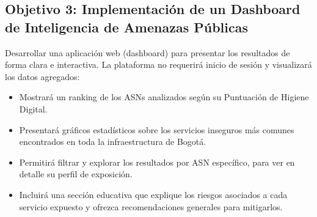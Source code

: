 \subsection{Objetivo 3: Implementación de un Dashboard de Inteligencia de Amenazas Públicas}

Desarrollar una aplicación web (dashboard) para presentar los resultados de forma clara e interactiva. La plataforma no requerirá inicio de sesión y visualizará los datos agregados:

\begin{itemize}
  \item Mostrará un ranking de los ASNs analizados según su Puntuación de Higiene Digital.
  \item Presentará gráficos estadísticos sobre los servicios inseguros más comunes encontrados en toda la infraestructura de Bogotá.
  \item Permitirá filtrar y explorar los resultados por ASN específico, para ver en detalle su perfil de exposición.
  \item Incluirá una sección educativa que explique los riesgos asociados a cada servicio expuesto y ofrezca recomendaciones generales para mitigarlos.
\end{itemize}
